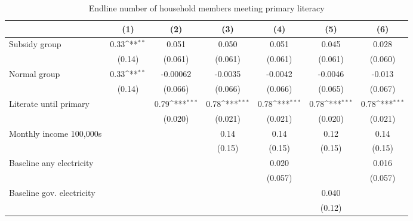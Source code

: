 \begin{table}[htbp]\centering
\def\sym#1{\ifmmode^{#1}\else\(^{#1}\)\fi}
\caption{Endline number of household members meeting primary literacy}
\begin{tabular*}{1\hsize}{@{\hskip\tabcolsep\extracolsep\fill}l*{6}{c}}
\toprule
                &\multicolumn{1}{c}{(1)}         &\multicolumn{1}{c}{(2)}         &\multicolumn{1}{c}{(3)}         &\multicolumn{1}{c}{(4)}         &\multicolumn{1}{c}{(5)}         &\multicolumn{1}{c}{(6)}         \\
\midrule
Subsidy group   &     0.33\sym{**} &    0.051         &    0.050         &    0.051         &    0.045         &    0.028         \\
                &   (0.14)         &  (0.061)         &  (0.061)         &  (0.061)         &  (0.061)         &  (0.060)         \\
Normal group    &     0.33\sym{**} & -0.00062         &  -0.0035         &  -0.0042         &  -0.0046         &   -0.013         \\
                &   (0.14)         &  (0.066)         &  (0.066)         &  (0.066)         &  (0.065)         &  (0.067)         \\
Literate until primary&                  &     0.79\sym{***}&     0.78\sym{***}&     0.78\sym{***}&     0.78\sym{***}&     0.78\sym{***}\\
                &                  &  (0.020)         &  (0.021)         &  (0.021)         &  (0.020)         &  (0.021)         \\
Monthly income 100,000s&                  &                  &     0.14         &     0.14         &     0.12         &     0.14         \\
                &                  &                  &   (0.15)         &   (0.15)         &   (0.15)         &   (0.15)         \\
Baseline any electricity&                  &                  &                  &    0.020         &                  &    0.016         \\
                &                  &                  &                  &  (0.057)         &                  &  (0.057)         \\
Baseline gov. electricity&                  &                  &                  &                  &    0.040         &                  \\
                &                  &                  &                  &                  &   (0.12)         &                  \\

\end{tabular*}
\end{table}
